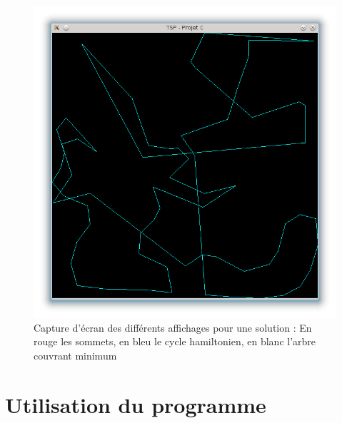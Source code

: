 \documentclass[a4paper,11pt]{article}
\begin{document}
\begin{center}
\begin{figure}[h]
\begin{center}
\includegraphics[scale=0.3]{cycleC.png}
\caption{Capture d'écran des différents affichages pour une solution : En rouge les sommets, en bleu le cycle hamiltonien, en blanc l'arbre couvrant minimum}
\label{fig3}
\end{center}
\end{figure}
\end{center}
\section{Utilisation du programme} %
\end{document}
